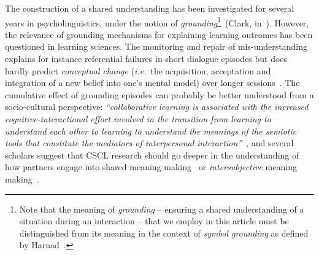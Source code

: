 \documentclass{sig-alternate}
\newcommand{\ie}{{\textit{i.e.~}}}
\begin{document}
The construction of a shared understanding has been investigated for several
years in psycholinguistics, under the  notion of \emph{grounding}\footnote{Note
that the meaning of \emph{grounding} -- ensuring a shared understanding of a
situation during an interaction -- that we employ in this article must be
distinguished from its meaning in the context of \emph{symbol grounding} as
defined by Harnad~\cite{harnad1990symbol}.}~(Clark,
in~\cite{clark1986referring}).  However, the relevance of grounding mechanisms
for explaining learning outcomes has been questioned in learning sciences. The
monitoring and repair of mis-understanding explains for instance referential
failures in short dialogue episodes but does hardly predict \emph{conceptual
change} (\ie the acquisition, acceptation and integration of a new belief into
one's mental model) over longer
sessions~\cite{dillenbourg2006sharing}. The cumulative effect of grounding
episodes can probably be better understood from a socio-cultural perspective:
\emph{``collaborative learning is associated with the increased
    cognitive-interactional effort involved in the transition from \emph{learning to
    understand each other} to \emph{learning to understand the meanings of the semiotic
tools that constitute the mediators of interpersonal
interaction}''}~\cite{baker1999role}, and
several scholars suggest that CSCL research should go deeper in the
understanding of how partners engage into shared meaning
making~\cite{stahl2007meaning} or \emph{intersubjective} meaning
making~\cite{suthers2006technology}.
\end{document}
